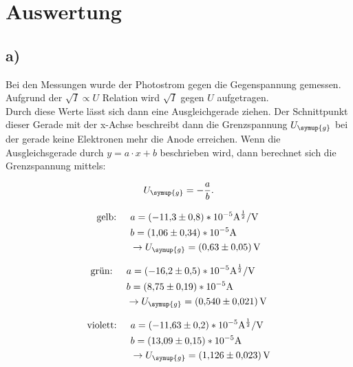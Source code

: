 \newpage
\section{Auswertung}

\subsection{a)}

    \noindent
    Bei den Messungen wurde der Photostrom gegen die Gegenspannung gemessen. 
    Aufgrund der $\sqrt{I} \propto  U$ Relation wird $\sqrt{I} $ gegen $  U$ aufgetragen.\\
    Durch diese Werte lässt sich dann eine Ausgleichgerade ziehen. Der Schnittpunkt dieser Gerade mit der x-Achse beschreibt dann die 
    Grenzspannung $U_{\symup{g}}$ bei der gerade keine Elektronen mehr die Anode erreichen. 
    Wenn die Ausgleichsgerade durch $y = a \cdot x +b$ beschrieben wird, dann berechnet sich die Grenzspannung mittels: 
    \noindent

    \begin{equation}
        U_{\symup{g}} = -  \frac{a}{b}. \nonumber
    \end{equation}

    \begin{align}
        \text{gelb:  }   \quad     &a = (-\num{11.3}\pm \num{0.8})*10^{-5} \si{\ampere^{\frac{1}{2}}\per\volt} \nonumber\\
                        &b = (\num{1.06}\pm \num{0.34})*10^{-5} \si{\ampere} \nonumber\\
                        & \rightarrow U_{\symup{g}} = \SI{0.63 \pm 0.05}{\volt} \nonumber
    \end{align}         

    \begin{align}
        \text{grün:  }   \quad     &a = (-\num{16.2}\pm \num{0.5})*10^{-5} \si{\ampere^{\frac{1}{2}}\per\volt} \nonumber\\
                            &b = (\num{8.75}\pm \num{0.19})*10^{-5} \si{\ampere} \nonumber\\
                            & \rightarrow U_{\symup{g}} = \SI{0.54 \pm 0.021}{\volt} \nonumber
    \end{align}

    \begin{align}
        \text{violett:  }  \quad      &a = (-\num{11.63}\pm \num{0.2})*10^{-5} \si{\ampere^{\frac{1}{2}}\per\volt} \nonumber\\
                               &b = (\num{13.09}\pm \num{0.15})*10^{-5} \si{\ampere} \nonumber\\
                               & \rightarrow U_{\symup{g}} = \SI{1.126 \pm 0.023}{\volt} \nonumber
    \end{align}

